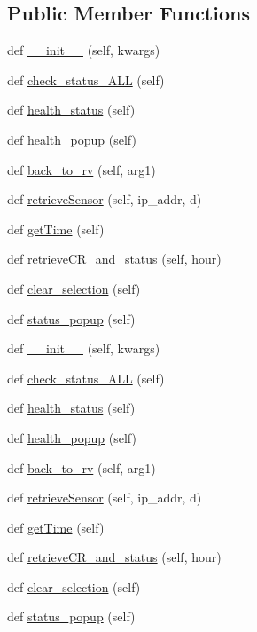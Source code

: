 \subsection*{Public Member Functions}
\begin{DoxyCompactItemize}
\item 
def \hyperlink{classGUI8_1_1Health_aa7e6e19d9db87725774678615b135709}{\+\_\+\+\_\+init\+\_\+\+\_\+} (self, kwargs)
\item 
def \hyperlink{classGUI8_1_1Health_a42a643ea13a14c53bfc681856be2f216}{check\+\_\+status\+\_\+\+A\+LL} (self)
\item 
def \hyperlink{classGUI8_1_1Health_a3ad87b74336ede1a14ece2d7ef504f82}{health\+\_\+status} (self)
\item 
def \hyperlink{classGUI8_1_1Health_a740ea34528236064297a25d1cc94ec6f}{health\+\_\+popup} (self)
\item 
def \hyperlink{classGUI8_1_1Health_a8ba7d780a1de6dd72011ffcb7a03a10c}{back\+\_\+to\+\_\+rv} (self, arg1)
\item 
def \hyperlink{classGUI8_1_1Health_a4acd1eda551dc56bdc3880785c5bce64}{retrieve\+Sensor} (self, ip\+\_\+addr, d)
\item 
def \hyperlink{classGUI8_1_1Health_a26a2e1f462c6db875f4fb580ed5b573a}{get\+Time} (self)
\item 
def \hyperlink{classGUI8_1_1Health_aabe5e1b2073d1e70495f64a59420450a}{retrieve\+C\+R\+\_\+and\+\_\+status} (self, hour)
\item 
def \hyperlink{classGUI8_1_1Health_aa1cc0aedd0fe8d91556e0f0c15f1f48c}{clear\+\_\+selection} (self)
\item 
def \hyperlink{classGUI8_1_1Health_a8640059475dc70c6254bc06f13343c45}{status\+\_\+popup} (self)
\item 
def \hyperlink{classGUI8_1_1Health_aa7e6e19d9db87725774678615b135709}{\+\_\+\+\_\+init\+\_\+\+\_\+} (self, kwargs)
\item 
def \hyperlink{classGUI8_1_1Health_a42a643ea13a14c53bfc681856be2f216}{check\+\_\+status\+\_\+\+A\+LL} (self)
\item 
def \hyperlink{classGUI8_1_1Health_a3ad87b74336ede1a14ece2d7ef504f82}{health\+\_\+status} (self)
\item 
def \hyperlink{classGUI8_1_1Health_a740ea34528236064297a25d1cc94ec6f}{health\+\_\+popup} (self)
\item 
def \hyperlink{classGUI8_1_1Health_a8ba7d780a1de6dd72011ffcb7a03a10c}{back\+\_\+to\+\_\+rv} (self, arg1)
\item 
def \hyperlink{classGUI8_1_1Health_a4acd1eda551dc56bdc3880785c5bce64}{retrieve\+Sensor} (self, ip\+\_\+addr, d)
\item 
def \hyperlink{classGUI8_1_1Health_a26a2e1f462c6db875f4fb580ed5b573a}{get\+Time} (self)
\item 
def \hyperlink{classGUI8_1_1Health_aabe5e1b2073d1e70495f64a59420450a}{retrieve\+C\+R\+\_\+and\+\_\+status} (self, hour)
\item 
def \hyperlink{classGUI8_1_1Health_aa1cc0aedd0fe8d91556e0f0c15f1f48c}{clear\+\_\+selection} (self)
\item 
def \hyperlink{classGUI8_1_1Health_a8640059475dc70c6254bc06f13343c45}{status\+\_\+popup} (self)
\end{DoxyCompactItemize}
